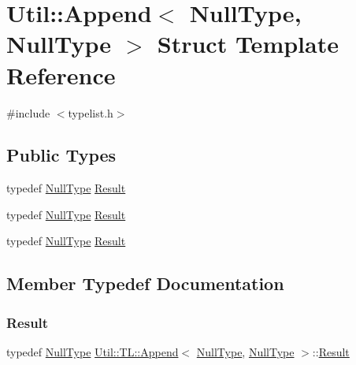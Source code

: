\hypertarget{structUtil_1_1TL_1_1Append_3_01NullType_00_01NullType_01_4}{}\section{Util\+:\+:Append$<$ Null\+Type, Null\+Type $>$ Struct Template Reference}
\label{structUtil_1_1TL_1_1Append_3_01NullType_00_01NullType_01_4}


{\ttfamily \#include $<$typelist.\+h$>$}

\subsection*{Public Types}
\begin{DoxyCompactItemize}
\item 
typedef \mbox{\hyperlink{classUtil_1_1NullType}{Null\+Type}} \mbox{\hyperlink{structUtil_1_1TL_1_1Append_3_01NullType_00_01NullType_01_4_adc4800f4356ff026fe01fbcb9e2ce62f}{Result}}
\item 
typedef \mbox{\hyperlink{classUtil_1_1NullType}{Null\+Type}} \mbox{\hyperlink{structUtil_1_1TL_1_1Append_3_01NullType_00_01NullType_01_4_adc4800f4356ff026fe01fbcb9e2ce62f}{Result}}
\item 
typedef \mbox{\hyperlink{classUtil_1_1NullType}{Null\+Type}} \mbox{\hyperlink{structUtil_1_1TL_1_1Append_3_01NullType_00_01NullType_01_4_adc4800f4356ff026fe01fbcb9e2ce62f}{Result}}
\end{DoxyCompactItemize}


\subsection{Member Typedef Documentation}
\mbox{\label{structUtil_1_1TL_1_1Append_3_01NullType_00_01NullType_01_4_adc4800f4356ff026fe01fbcb9e2ce62f}} 
\subsubsection{\texorpdfstring{Result}{Result}\hspace{0.1cm}{\footnotesize\ttfamily [1/3]}}
{\footnotesize\ttfamily typedef \mbox{\hyperlink{classUtil_1_1NullType}{Null\+Type}} \mbox{\hyperlink{structUtil_1_1TL_1_1Append}{Util\+::\+T\+L\+::\+Append}}$<$ \mbox{\hyperlink{classUtil_1_1NullType}{Null\+Type}}, \mbox{\hyperlink{classUtil_1_1NullType}{Null\+Type}} $>$\+::\mbox{\hyperlink{structUtil_1_1TL_1_1Append_3_01NullType_00_01NullType_01_4_adc4800f4356ff026fe01fbcb9e2ce62f}{Result}}}

